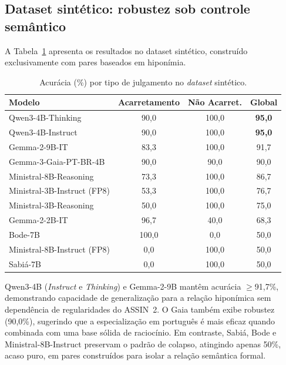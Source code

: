 \documentclass[12pt]{article}
\begin{document}
\subsection{Dataset sintético: robustez sob controle semântico}

A Tabela~\ref{tab:sintetico} apresenta os resultados no dataset sintético,
construído exclusivamente com pares baseados em hiponímia.

\begin{table}[htbp]
\centering
\caption{Acurácia (\%) por tipo de julgamento no \emph{dataset} sintético.}
\label{tab:sintetico}
\begin{tabular}{lccc}
\toprule
\textbf{Modelo} & \textbf{Acarretamento} & \textbf{Não Acarret.} & \textbf{Global} \\
\midrule
Qwen3-4B-Thinking            & 90,0  & 100,0 & \textbf{95,0} \\
Qwen3-4B-Instruct            & 90,0  & 100,0 & \textbf{95,0} \\
Gemma-2-9B-IT                & 83,3  & 100,0 & 91,7 \\
Gemma-3-Gaia-PT-BR-4B        & 90,0  & 90,0  & 90,0 \\
Ministral-8B-Reasoning       & 73,3  & 100,0 & 86,7 \\
Ministral-3B-Instruct (FP8)  & 53,3  & 100,0 & 76,7 \\
Ministral-3B-Reasoning       & 50,0  & 100,0 & 75,0 \\
Gemma-2-2B-IT                & 96,7  & 40,0  & 68,3 \\
Bode-7B                      & 100,0 & 0,0   & 50,0 \\
Ministral-8B-Instruct (FP8)  & 0,0   & 100,0 & 50,0 \\
Sabiá-7B                     & 0,0   & 100,0 & 50,0 \\
\bottomrule
\end{tabular}
\end{table}

Qwen3-4B (\emph{Instruct} e \emph{Thinking}) e Gemma-2-9B mantêm acurácia
$\geq$91,7\%, demonstrando capacidade de generalização para a relação hiponímica
sem dependência de regularidades do ASSIN~2. O Gaia também exibe robustez
(90,0\%), sugerindo que a especialização em português é mais eficaz quando
combinada com uma base sólida de raciocínio. Em contraste, Sabiá, Bode e
Ministral-8B-Instruct preservam o padrão de colapso, atingindo apenas 50\%,
acaso puro, em pares construídos para isolar a relação semântica formal.
\end{document}
